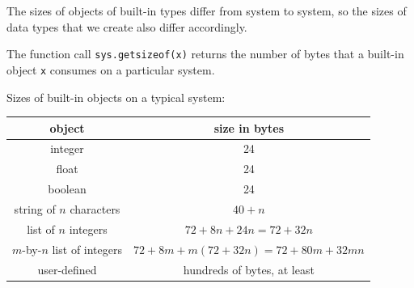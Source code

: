\documentclass[8pt,a4paper,compress,handout]{beamer}
\begin{document}
\begin{frame}[fragile]
The sizes of objects of built-in types differ from system to system, so the sizes of data types that we create also differ accordingly.

\bigskip

The function call \lstinline{sys.getsizeof(x)} returns the number of bytes that a built-in object \lstinline{x} consumes on a particular system.

\bigskip

Sizes of built-in objects on a typical system:
\begin{center}
\begin{tabular}{cc}
object & size in bytes \\ \hline
integer & 24 \\ 
float & 24 \\ 
boolean & 24 \\ 
string of $n$ characters & $40 + n$ \\
list of $n$ integers & $72 + 8n + 24n = 72 + 32n$ \\
$m$-by-$n$ list of integers & $72 + 8m + m(72 + 32n) = 72 + 80m + 32mn$ \\
user-defined & hundreds of bytes, at least
\end{tabular} 
\end{center}
\end{frame}
\end{document}
